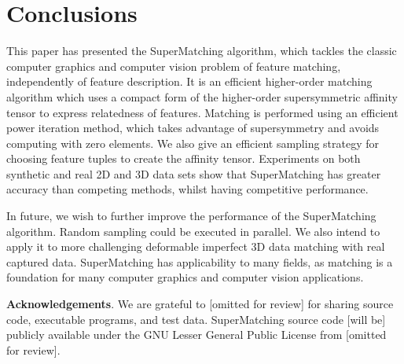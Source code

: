 \section{Conclusions}
\label{sec:conclusion}

This paper has presented the SuperMatching algorithm,
which tackles the classic computer graphics and computer vision problem of feature matching, independently of feature description.
It is an efficient higher-order matching algorithm which uses a compact form of the higher-order supersymmetric affinity tensor to express relatedness of features.
Matching is performed using an efficient power iteration method, which takes advantage of supersymmetry and avoids computing with zero elements.
We also give an efficient sampling strategy for choosing feature tuples to create the affinity tensor.
Experiments on both synthetic and real 2D and 3D data sets show that
SuperMatching has greater accuracy than competing methods, whilst having competitive performance.

In future, we wish to further improve the performance of the SuperMatching algorithm.
Random sampling could be executed in parallel.
We also intend to apply it to more challenging deformable imperfect 3D data matching with real captured data.
SuperMatching has applicability to many fields,
as matching is a foundation for many computer graphics and computer vision applications.


\textbf{Acknowledgements}. We are grateful to [omitted for review] for sharing source code, executable programs, and test data.
SuperMatching source code [will be] publicly available under the GNU Lesser General Public License from [omitted for review].

